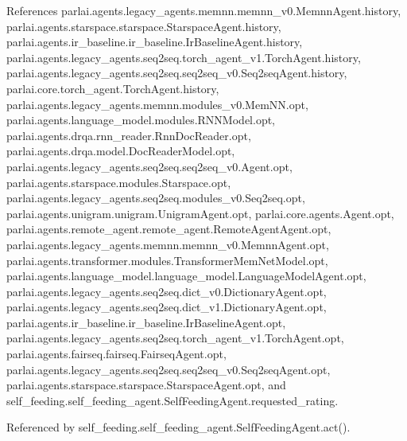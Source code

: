 References parlai.\+agents.\+legacy\+\_\+agents.\+memnn.\+memnn\+\_\+v0.\+Memnn\+Agent.\+history, parlai.\+agents.\+starspace.\+starspace.\+Starspace\+Agent.\+history, parlai.\+agents.\+ir\+\_\+baseline.\+ir\+\_\+baseline.\+Ir\+Baseline\+Agent.\+history, parlai.\+agents.\+legacy\+\_\+agents.\+seq2seq.\+torch\+\_\+agent\+\_\+v1.\+Torch\+Agent.\+history, parlai.\+agents.\+legacy\+\_\+agents.\+seq2seq.\+seq2seq\+\_\+v0.\+Seq2seq\+Agent.\+history, parlai.\+core.\+torch\+\_\+agent.\+Torch\+Agent.\+history, parlai.\+agents.\+legacy\+\_\+agents.\+memnn.\+modules\+\_\+v0.\+Mem\+N\+N.\+opt, parlai.\+agents.\+language\+\_\+model.\+modules.\+R\+N\+N\+Model.\+opt, parlai.\+agents.\+drqa.\+rnn\+\_\+reader.\+Rnn\+Doc\+Reader.\+opt, parlai.\+agents.\+drqa.\+model.\+Doc\+Reader\+Model.\+opt, parlai.\+agents.\+legacy\+\_\+agents.\+seq2seq.\+seq2seq\+\_\+v0.\+Agent.\+opt, parlai.\+agents.\+starspace.\+modules.\+Starspace.\+opt, parlai.\+agents.\+legacy\+\_\+agents.\+seq2seq.\+modules\+\_\+v0.\+Seq2seq.\+opt, parlai.\+agents.\+unigram.\+unigram.\+Unigram\+Agent.\+opt, parlai.\+core.\+agents.\+Agent.\+opt, parlai.\+agents.\+remote\+\_\+agent.\+remote\+\_\+agent.\+Remote\+Agent\+Agent.\+opt, parlai.\+agents.\+legacy\+\_\+agents.\+memnn.\+memnn\+\_\+v0.\+Memnn\+Agent.\+opt, parlai.\+agents.\+transformer.\+modules.\+Transformer\+Mem\+Net\+Model.\+opt, parlai.\+agents.\+language\+\_\+model.\+language\+\_\+model.\+Language\+Model\+Agent.\+opt, parlai.\+agents.\+legacy\+\_\+agents.\+seq2seq.\+dict\+\_\+v0.\+Dictionary\+Agent.\+opt, parlai.\+agents.\+legacy\+\_\+agents.\+seq2seq.\+dict\+\_\+v1.\+Dictionary\+Agent.\+opt, parlai.\+agents.\+ir\+\_\+baseline.\+ir\+\_\+baseline.\+Ir\+Baseline\+Agent.\+opt, parlai.\+agents.\+legacy\+\_\+agents.\+seq2seq.\+torch\+\_\+agent\+\_\+v1.\+Torch\+Agent.\+opt, parlai.\+agents.\+fairseq.\+fairseq.\+Fairseq\+Agent.\+opt, parlai.\+agents.\+legacy\+\_\+agents.\+seq2seq.\+seq2seq\+\_\+v0.\+Seq2seq\+Agent.\+opt, parlai.\+agents.\+starspace.\+starspace.\+Starspace\+Agent.\+opt, and self\+\_\+feeding.\+self\+\_\+feeding\+\_\+agent.\+Self\+Feeding\+Agent.\+requested\+\_\+rating.



Referenced by self\+\_\+feeding.\+self\+\_\+feeding\+\_\+agent.\+Self\+Feeding\+Agent.\+act().

